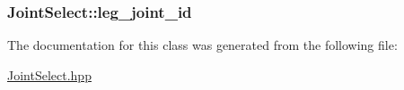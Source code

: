 \subsubsection[{\texorpdfstring{leg\+\_\+joint\+\_\+id}{leg_joint_id}}]{ Joint\+Select\+::leg\+\_\+joint\+\_\+id}\hypertarget{classJointSelect_a623cd710b2030358e8c63417e9c01ead}{}\label{classJointSelect_a623cd710b2030358e8c63417e9c01ead}


The documentation for this class was generated from the following file\+:\begin{DoxyCompactItemize}
\item 
\hyperlink{JointSelect_8hpp}{Joint\+Select.\+hpp}\end{DoxyCompactItemize}
